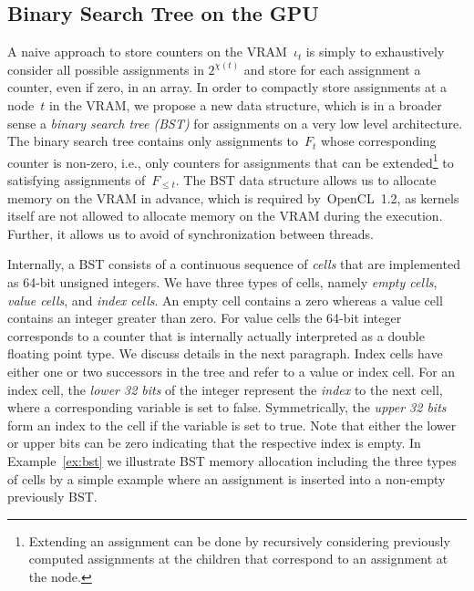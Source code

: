 \documentclass{llncs}
\begin{document}
\subsection{Binary Search Tree on the GPU}
A naive approach to store counters on the VRAM~$\iota_t$ is simply to
exhaustively consider all possible assignments in $2^{\chi(t)}$ and
store for each assignment a counter, even if zero, in an array.
%
%
In order to compactly store assignments at a node~$t$ in the VRAM, we
propose a new data structure, which is in a broader sense a
\emph{binary search tree (BST)} for assignments on a very low level
architecture.
%
The binary search tree contains only assignments to~$F_t$ whose
corresponding counter is non-zero, i.e., only counters for
assignments that can be extended\footnote{Extending an assignment can be
  done by recursively considering previously computed assignments at
  the children that correspond to an assignment at the node.} to
satisfying assignments of~$F_{\leq t}$.
%
%
The BST data structure allows us to allocate memory on the VRAM in
advance, which is required by~OpenCL~1.2, as kernels itself are not
allowed to allocate memory on the VRAM during the execution.
%
Further, it allows us to avoid of synchronization between threads.
%

%
Internally, a BST consists of a continuous sequence of \emph{cells}
that are implemented as 64-bit unsigned integers.  We have three types
of cells, namely \emph{empty cells}, \emph{value cells}, and
\emph{index cells}.  An empty cell contains a zero whereas a value
cell contains an integer greater than zero.  For value cells the
64-bit integer corresponds to a counter that is internally actually
interpreted as a double floating point type. We discuss details in the
next paragraph.
%
Index cells have either one or two successors in the tree and refer to
a value or index cell.
For an index cell, the \emph{lower 32 bits} of the integer represent the
\emph{index} to the next cell, where a corresponding variable is set to
false.  Symmetrically, the \emph{upper 32 bits} form an index to the cell if
the variable is set to true.  Note that either the lower or upper bits
can be zero indicating that the respective index is empty.
%
In Example~\ref{ex:bst} we illustrate BST memory allocation including
the three types of cells by a simple example where an assignment is
inserted into a non-empty previously BST.
\end{document}
